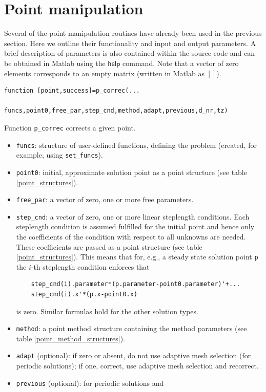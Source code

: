 \documentclass[10pt]{scrartcl}
\newcommand{\parm}[1]{\mathsf{#1}}
\newcommand{\blist}[1]{\mbox{\lstinline!#1!}}
\begin{document}
{\fi
\section{Point manipulation}\label{point_manipulation}

Several of the point manipulation routines have already been used in
the previous section.  Here we outline their functionality and input
and output parameters.  A brief description of parameters is also
contained within the source code and can be obtained in Matlab using
the $\parm{help}$ command. Note that a vector of zero elements
corresponds to an empty matrix (written in Matlab as $[]$). 
\begin{lstlisting}
function [point,success]=p_correc(...
          funcs,point0,free_par,step_cnd,method,adapt,previous,d_nr,tz)  
\end{lstlisting}
\noindent Function \blist{p_correc} corrects a given point.
\begin{itemize}
\item \blist{funcs}: structure of user-defined functions, defining the
  problem (created, for example, using \blist{set_funcs}).
\item \blist{point0}: initial, approximate solution point as a point
  structure (see table \ref{point_structures}).
\item \blist{free_par}: a vector of zero, one or more free parameters.
\item \blist{step_cnd}: a vector of zero, one or more linear
  steplength conditions. Each steplength condition is assumed
  fulfilled for the initial point and hence only the coefficients of
  the condition with respect to all unknowns are needed. These
  coefficients are passed as a point structure (see table
  \ref{point_structures}).  This means that for, e.g., a steady state
  solution point \blist{p} the $i$-th steplength condition enforces that
  \begin{lstlisting}
    step_cnd(i).parameter*(p.parameter-point0.parameter)'+...
    step_cnd(i).x'*(p.x-point0.x)
  \end{lstlisting}
  is zero. Similar formulas hold for the other solution types.
\item \blist{method}: a point method structure containing the method
  parameters (see table \ref{point_method_structures}).
\item \blist{adapt} (optional): if zero or absent, do not use adaptive
  mesh selection (for periodic solutions); if one, correct, use
  adaptive mesh selection and recorrect.
\item \blist{previous} (optional): for periodic solutions and

\end{itemize}}
\end{document}
